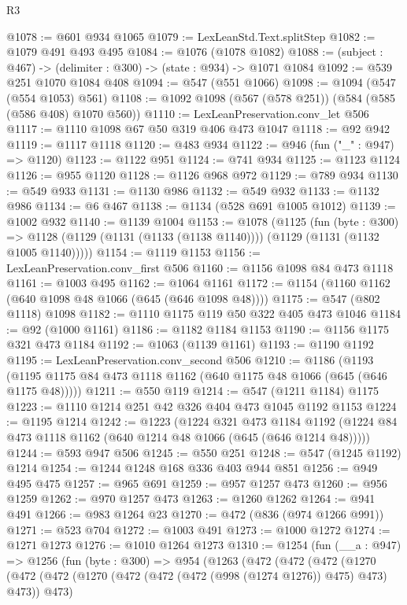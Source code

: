 \begin{lexlean}{R3}
\begin{coremodule}
@1078 := @601 @934 @1065
@1079 := LexLeanStd.Text.splitStep
@1082 := @1079 @491 @493 @495
@1084 := @1076 (@1078 @1082)
@1088 := (subject : @467) -> (delimiter : @300) -> (state : @934) -> @1071 @1084
@1092 := @539 @251 @1070 @1084 @408
@1094 := @547 (@551 @1066)
@1098 := @1094 (@547 (@554 @1053) @561)
@1108 := @1092 @1098 (@567 (@578 @251)) (@584 (@585 (@586 @408) @1070 @560))
@1110 := LexLeanPreservation.conv_let @506
@1117 := @1110 @1098 @67 @50 @319 @406 @473 @1047
@1118 := @92 @942
@1119 := @1117 @1118
@1120 := @483 @934
@1122 := @946 (fun ("_" : @947) => @1120)
@1123 := @1122 @951
@1124 := @741 @934
@1125 := @1123 @1124
@1126 := @955 @1120
@1128 := @1126 @968 @972
@1129 := @789 @934
@1130 := @549 @933
@1131 := @1130 @986
@1132 := @549 @932
@1133 := @1132 @986
@1134 := @6 @467
@1138 := @1134 (@528 @691 @1005 @1012)
@1139 := @1002 @932
@1140 := @1139 @1004
@1153 := @1078
    (@1125
      (fun (byte : @300) =>
      @1128 (@1129 (@1131 (@1133 (@1138 @1140)))) (@1129 (@1131 (@1132 @1005 @1140)))))
@1154 := @1119 @1153
@1156 := LexLeanPreservation.conv_first @506
@1160 := @1156 @1098 @84 @473 @1118
@1161 := @1003 @495
@1162 := @1064 @1161
@1172 := @1154 (@1160 @1162 (@640 @1098 @48 @1066 (@645 (@646 @1098 @48))))
@1175 := @547 (@802 @1118) @1098
@1182 := @1110 @1175 @119 @50 @322 @405 @473 @1046
@1184 := @92 (@1000 @1161)
@1186 := @1182 @1184 @1153
@1190 := @1156 @1175 @321 @473 @1184
@1192 := @1063 (@1139 @1161)
@1193 := @1190 @1192
@1195 := LexLeanPreservation.conv_second @506
@1210 := @1186
    (@1193 (@1195 @1175 @84 @473 @1118 @1162 (@640 @1175 @48 @1066 (@645 (@646 @1175 @48)))))
@1211 := @550 @119
@1214 := @547 (@1211 @1184) @1175
@1223 := @1110 @1214 @251 @42 @326 @404 @473 @1045 @1192 @1153
@1224 := @1195 @1214
@1242 := @1223
    (@1224
      @321
      @473
      @1184
      @1192
      (@1224 @84 @473 @1118 @1162 (@640 @1214 @48 @1066 (@645 (@646 @1214 @48)))))
@1244 := @593 @947 @506
@1245 := @550 @251
@1248 := @547 (@1245 @1192) @1214
@1254 := @1244 @1248 @168 @336 @403 @944 @851
@1256 := @949 @495 @475
@1257 := @965 @691
@1259 := @957 @1257 @473
@1260 := @956 @1259
@1262 := @970 @1257 @473
@1263 := @1260 @1262
@1264 := @941 @491
@1266 := @983 @1264 @23
@1270 := @472 (@836 (@974 @1266 @991))
@1271 := @523 @704
@1272 := @1003 @491
@1273 := @1000 @1272
@1274 := @1271 @1273
@1276 := @1010 @1264 @1273
@1310 := @1254
    (fun (__a : @947) =>
    @1256
      (fun (byte : @300) =>
      @954
        (@1263
          (@472
            (@472
              (@472
                (@1270
                  (@472
                    (@472 (@1270 (@472 (@472 (@472 (@998 (@1274 @1276)) @475) @473) @473)) @473)

\end{coremodule}
\end{lexlean}
